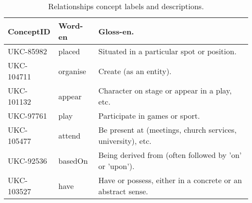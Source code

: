 \begin{table}[H]
    \centering
    \renewcommand{\arraystretch}{1.5} %
    \begin{tabularx}{\textwidth}{|M{3cm}|M{3cm}|X|}
        \hline
        \textbf{ConceptID} & \textbf{Word-en} & \textbf{Gloss-en}.\\ \hline
        UKC-85982 & placed & Situated in a particular spot or position.\\ \hline
        UKC-104711  & organise & Create (as an entity).\\ \hline
        UKC-101132 & appear  & Character on stage or appear in a play, etc.\\ \hline
        UKC-97761  & play & Participate in games or sport.\\ \hline
        UKC-105477 & attend & Be present at (meetings, church services, university), etc.\\ \hline
        UKC-92536  & basedOn & Being derived from (often followed by 'on' or 'upon').\\ \hline
        UKC-103527  & have & Have or possess, either in a concrete or an abstract sense.\\ \hline
    \end{tabularx}
    \caption{Relationships concept labels and descriptions.}
    \label{tab:table2}
\end{table}

